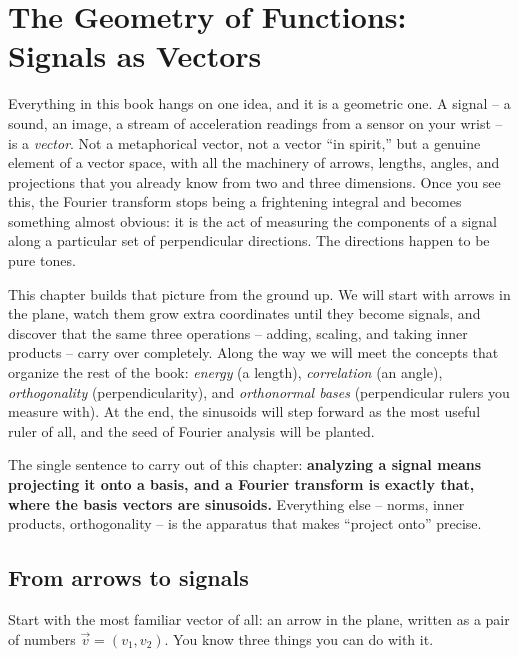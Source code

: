\chapter{The Geometry of Functions: Signals as Vectors}

\chapterline

Everything in this book hangs on one idea, and it is a geometric one. A signal -- a sound, an
image, a stream of acceleration readings from a sensor on your wrist -- is a \emph{vector}. Not a
metaphorical vector, not a vector ``in spirit,'' but a genuine element of a vector space, with all
the machinery of arrows, lengths, angles, and projections that you already know from two and three
dimensions. Once you see this, the Fourier transform stops being a frightening integral and becomes
something almost obvious: it is the act of measuring the components of a signal along a particular
set of perpendicular directions. The directions happen to be pure tones.

This chapter builds that picture from the ground up. We will start with arrows in the plane, watch
them grow extra coordinates until they become signals, and discover that the same three
operations -- adding, scaling, and taking inner products -- carry over completely. Along the way we
will meet the concepts that organize the rest of the book: \emph{energy} (a length), \emph{
correlation} (an angle), \emph{orthogonality} (perpendicularity), and \emph{orthonormal bases}
(perpendicular rulers you measure with). At the end, the sinusoids will step forward as the most
useful ruler of all, and the seed of Fourier analysis will be planted.

\begin{focusbox}
The single sentence to carry out of this chapter: \textbf{analyzing a signal means projecting it
onto a basis, and a Fourier transform is exactly that, where the basis vectors are sinusoids.}
Everything else -- norms, inner products, orthogonality -- is the apparatus that makes ``project
onto'' precise.
\end{focusbox}

\section{From arrows to signals}
\label{ch03:arrows}

Start with the most familiar vector of all: an arrow in the plane, written as a pair of numbers
$\vec{v} = (v_1, v_2)$. You know three things you can do with it.

